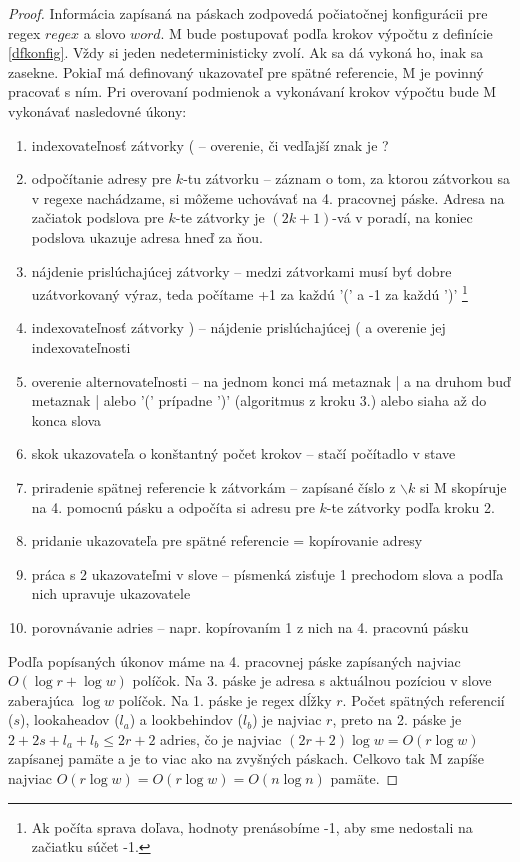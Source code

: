 \begin{proof}
Informácia zapísaná na páskach zodpovedá počiatočnej konfigurácii pre regex $regex$ a slovo $word$. M bude postupovať podľa krokov výpočtu z definície \ref{dfkonfig}. Vždy si jeden nedeterministicky zvolí. Ak sa dá vykoná ho, inak sa zasekne. Pokiaľ má definovaný ukazovateľ pre spätné referencie, M je povinný pracovať s ním. Pri overovaní podmienok a vykonávaní krokov výpočtu bude M vykonávať nasledovné úkony:
\begin{enumerate}
\item indexovateľnosť zátvorky ( -- overenie, či vedľajší znak je ?
\item odpočítanie adresy pre $k$-tu zátvorku -- záznam o tom, za ktorou zátvorkou sa v regexe nachádzame, si môžeme uchovávať na 4. pracovnej páske. Adresa na začiatok podslova pre $k$-te zátvorky je $(2k+1)$-vá v poradí, na koniec podslova ukazuje adresa hneď za ňou.
\item nájdenie prislúchajúcej zátvorky -- medzi zátvorkami musí byť dobre uzátvorkovaný výraz, teda počítame +1 za každú '(' a -1 za každú ')' \footnote{Ak počíta sprava doľava, hodnoty prenásobíme -1, aby sme nedostali na začiatku súčet -1.}
\item indexovateľnosť zátvorky ) -- nájdenie prislúchajúcej ( a overenie jej indexovateľnosti
\item overenie alternovateľnosti -- na jednom konci má metaznak | a na druhom buď metaznak | alebo '(' prípadne ')' (algoritmus z kroku 3.) alebo siaha až do konca slova
\item skok ukazovateľa o konštantný počet krokov -- stačí počítadlo v stave
\item priradenie spätnej referencie k zátvorkám -- zapísané číslo z $\backslash k$ si M skopíruje na 4. pomocnú pásku a odpočíta si adresu pre $k$-te zátvorky podľa kroku 2.
\item pridanie ukazovateľa pre spätné referencie = kopírovanie adresy
\item práca s 2 ukazovateľmi v slove -- písmenká zisťuje 1 prechodom slova a podľa nich upravuje ukazovatele
\item porovnávanie adries -- napr. kopírovaním 1 z nich na 4. pracovnú pásku
\end{enumerate}
Podľa popísaných úkonov máme na 4. pracovnej páske zapísaných najviac $O(\log r + \log w)$ políčok. Na 3. páske je adresa s aktuálnou pozíciou v slove zaberajúca $\log w$ políčok. Na 1. páske je regex dĺžky $r$. Počet spätných referencií ($s$), lookaheadov ($l_a$) a lookbehindov ($l_b$) je najviac $r$, preto na 2. páske je $2+2s+l_a+l_b\leq 2r+2$ adries, čo je najviac $(2r+2)\log w = O(r \log w)$ zapísanej pamäte a je to viac ako na zvyšných páskach. Celkovo tak M zapíše najviac $O(r \log w) = O(r \log w) = O(n\log n)$ pamäte.
\end{proof}

